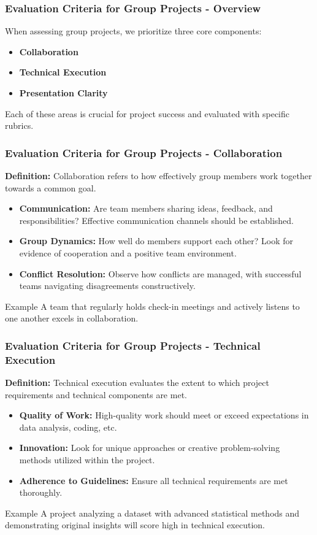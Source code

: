 \documentclass[aspectratio=169]{beamer}
\begin{document}
\begin{frame}[fragile]
    \frametitle{Evaluation Criteria for Group Projects - Overview}
    When assessing group projects, we prioritize three core components:
    \begin{itemize}
        \item \textbf{Collaboration}
        \item \textbf{Technical Execution}
        \item \textbf{Presentation Clarity}
    \end{itemize}
    Each of these areas is crucial for project success and evaluated with specific rubrics.
\end{frame}

\begin{frame}[fragile]
    \frametitle{Evaluation Criteria for Group Projects - Collaboration}
    \textbf{Definition:} Collaboration refers to how effectively group members work together towards a common goal.

    \begin{itemize}
        \item \textbf{Communication:} Are team members sharing ideas, feedback, and responsibilities? Effective communication channels should be established.
        \item \textbf{Group Dynamics:} How well do members support each other? Look for evidence of cooperation and a positive team environment.
        \item \textbf{Conflict Resolution:} Observe how conflicts are managed, with successful teams navigating disagreements constructively.
    \end{itemize}

    \begin{block}{Example}
    A team that regularly holds check-in meetings and actively listens to one another excels in collaboration.
    \end{block}
\end{frame}

\begin{frame}[fragile]
    \frametitle{Evaluation Criteria for Group Projects - Technical Execution}
    \textbf{Definition:} Technical execution evaluates the extent to which project requirements and technical components are met.

    \begin{itemize}
        \item \textbf{Quality of Work:} High-quality work should meet or exceed expectations in data analysis, coding, etc.
        \item \textbf{Innovation:} Look for unique approaches or creative problem-solving methods utilized within the project.
        \item \textbf{Adherence to Guidelines:} Ensure all technical requirements are met thoroughly.
    \end{itemize}

    \begin{block}{Example}
    A project analyzing a dataset with advanced statistical methods and demonstrating original insights will score high in technical execution.
    \end{block}
\end{frame}
\end{document}
